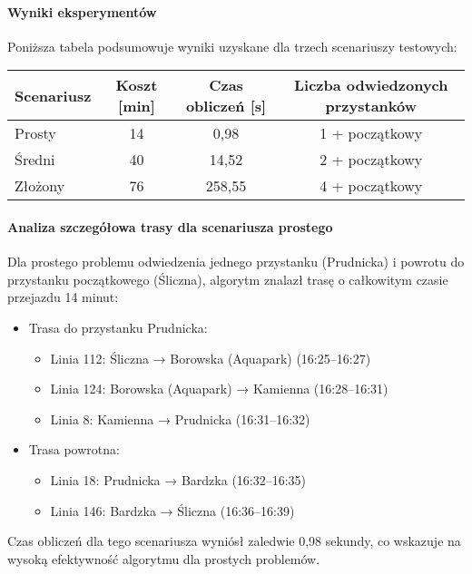 \documentclass[12pt,a4paper]{article}
\begin{document}
\paragraph{Wyniki eksperymentów}
Poniższa tabela podsumowuje wyniki uzyskane dla trzech scenariuszy testowych:

\begin{center}
\begin{tabular}{|l|c|c|c|}
\hline
\textbf{Scenariusz} & \textbf{Koszt [min]} & \textbf{Czas obliczeń [s]} & \textbf{Liczba odwiedzonych przystanków} \\
\hline
Prosty & 14 & 0,98 & 1 + początkowy \\
Średni & 40 & 14,52 & 2 + początkowy \\
Złożony & 76 & 258,55 & 4 + początkowy \\
\hline
\end{tabular}
\end{center}

\paragraph{Analiza szczegółowa trasy dla scenariusza prostego}
Dla prostego problemu odwiedzenia jednego przystanku (Prudnicka) i powrotu do przystanku początkowego (Śliczna), algorytm znalazł trasę o całkowitym czasie przejazdu 14 minut:

\begin{itemize}
    \item Trasa do przystanku Prudnicka:
    \begin{itemize}
        \item Linia 112: Śliczna → Borowska (Aquapark) (16:25--16:27)
        \item Linia 124: Borowska (Aquapark) → Kamienna (16:28--16:31)
        \item Linia 8: Kamienna → Prudnicka (16:31--16:32)
    \end{itemize}
    \item Trasa powrotna:
    \begin{itemize}
        \item Linia 18: Prudnicka → Bardzka (16:32--16:35)
        \item Linia 146: Bardzka → Śliczna (16:36--16:39)
    \end{itemize}
\end{itemize}

Czas obliczeń dla tego scenariusza wyniósł zaledwie 0,98 sekundy, co wskazuje na wysoką efektywność algorytmu dla prostych problemów.
\end{document}
